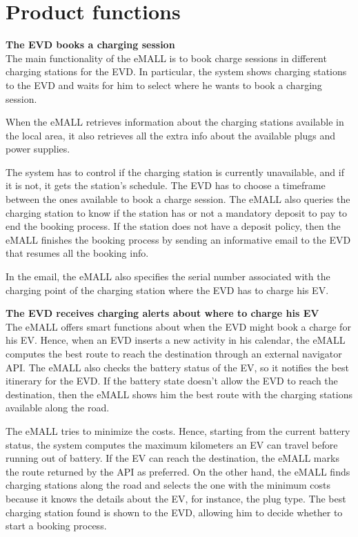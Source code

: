\section{Product functions}
\label{sec:product_functions}%
\textbf{The EVD books a charging session} \\
The main functionality of the eMALL is to book charge sessions in different charging stations for the EVD\@.
In particular, the system shows charging stations to the EVD and waits for him to select where he wants to book a charging session.

When the eMALL retrieves information about the charging stations available in the local area, it also retrieves all the extra info about the available plugs and power supplies.

The system has to control if the charging station is currently unavailable, and if it is not, it gets the station's schedule.
The EVD has to choose a timeframe between the ones available to book a charge session.
The eMALL also queries the charging station to know if the station has or not a mandatory deposit to pay to end the booking process.
If the station does not have a deposit policy, then the eMALL finishes the booking process by sending an informative email to the EVD that resumes all the booking info.

In the email, the eMALL also specifies the serial number associated with the charging point of the charging station where the EVD has to charge his EV\@.

\textbf{The EVD receives charging alerts about where to charge his EV} \\
The eMALL offers smart functions about when the EVD might book a charge for his EV\@.
Hence, when an EVD inserts a new activity in his calendar, the eMALL computes the best route to reach the destination through an external navigator API\@.
The eMALL also checks the battery status of the EV, so it notifies the best itinerary for the EVD\@.
If the battery state doesn't allow the EVD to reach the destination, then the eMALL shows him the best route with the charging stations available along the road.

The eMALL tries to minimize the costs.
Hence, starting from the current battery status, the system computes the maximum kilometers an EV can travel before running out of battery.
If the EV can reach the destination, the eMALL marks the route returned by the API as preferred.
On the other hand, the eMALL finds charging stations along the road and selects the one with the minimum costs because it knows the details about the EV, for instance, the plug type.
The best charging station found is shown to the EVD, allowing him to decide whether to start a booking process.

